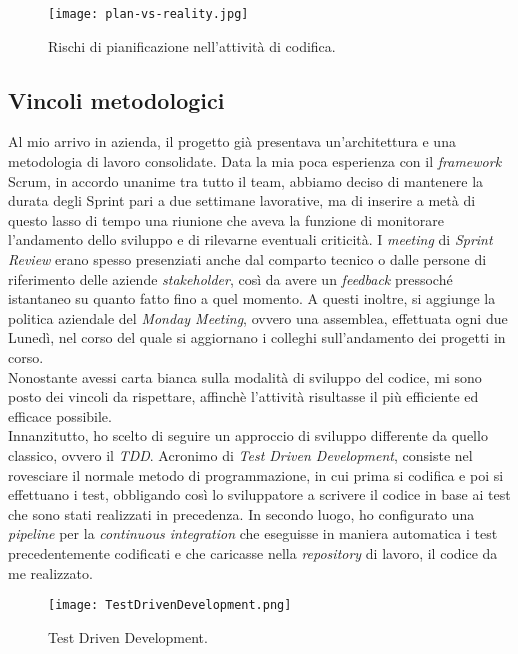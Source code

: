 \begin{figure}[h]
\texttt{[image: plan-vs-reality.jpg]}
\centering
\caption{Rischi di pianificazione nell'attività di codifica.} 
\label{fig:plan-vs-reality}
\end{figure}

\subsection{Vincoli metodologici}
\label{subsec:vincoli-metodologici}
Al mio arrivo in azienda, il progetto già presentava un'architettura e una metodologia di lavoro consolidate.
Data la mia poca esperienza con il \textit{framework} Scrum, in accordo unanime tra tutto il team, abbiamo deciso di mantenere la durata degli Sprint pari a due settimane lavorative, ma di inserire a metà di questo lasso di tempo una riunione che aveva la funzione di monitorare l'andamento dello sviluppo e di rilevarne eventuali criticità. I \textit{meeting} di \textit{Sprint Review} erano spesso presenziati anche dal comparto tecnico o dalle persone di riferimento delle aziende \textit{stakeholder}, così da avere un \textit{feedback} pressoché istantaneo su quanto fatto fino a quel momento.
A questi inoltre, si aggiunge la politica aziendale del \textit{Monday Meeting}, ovvero una assemblea, effettuata ogni due Lunedì, nel corso del quale si aggiornano i colleghi sull'andamento dei progetti in corso.\\
Nonostante avessi carta bianca sulla modalità di sviluppo del codice, mi sono posto dei vincoli da rispettare, affinchè l'attività risultasse il più efficiente ed efficace possibile.\\
Innanzitutto, ho scelto di seguire un approccio di sviluppo differente da quello classico, ovvero il \textit{TDD}. Acronimo di \textit{Test Driven Development}, consiste nel rovesciare il normale metodo di programmazione, in cui prima si codifica e poi si effettuano i test, obbligando così lo sviluppatore a scrivere il codice in base ai test che sono stati realizzati in precedenza.
In secondo luogo, ho configurato una \textit{pipeline} per la \textit{continuous integration} che eseguisse in maniera automatica i test precedentemente codificati e che caricasse nella \textit{repository} di lavoro, il codice da me realizzato.
\begin{figure}[h]
\texttt{[image: TestDrivenDevelopment.png]}
\centering
\caption{Test Driven Development.} 
\label{fig:tdd}
\end{figure}
